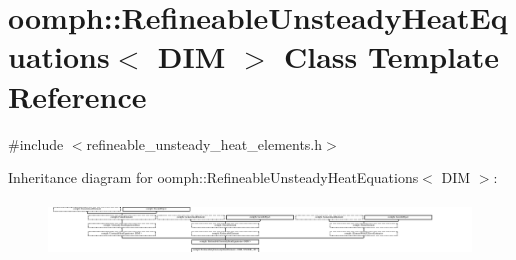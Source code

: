 \hypertarget{classoomph_1_1RefineableUnsteadyHeatEquations}{}\section{oomph\+:\+:Refineable\+Unsteady\+Heat\+Equations$<$ D\+IM $>$ Class Template Reference}
\label{classoomph_1_1RefineableUnsteadyHeatEquations}


{\ttfamily \#include $<$refineable\+\_\+unsteady\+\_\+heat\+\_\+elements.\+h$>$}

Inheritance diagram for oomph\+:\+:Refineable\+Unsteady\+Heat\+Equations$<$ D\+IM $>$\+:\begin{figure}[H]
\begin{center}
\leavevmode
\includegraphics[height=1.477573cm]{classoomph_1_1RefineableUnsteadyHeatEquations}
\end{center}
\end{figure}
